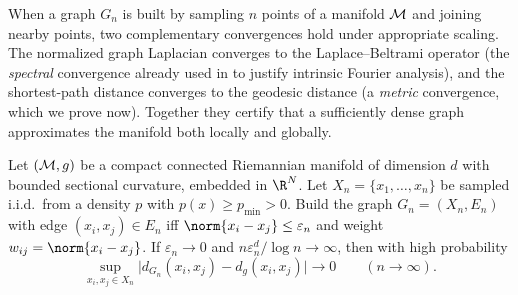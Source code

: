 When a graph $G_n$ is built by sampling $n$ points of a manifold $\mathcal{M}$ and
joining nearby points, two complementary convergences hold under appropriate
scaling. The normalized graph Laplacian converges to the Laplace--Beltrami
operator (the \emph{spectral} convergence already used in  to
justify intrinsic Fourier analysis), and the shortest-path distance converges to
the geodesic distance (a \emph{metric} convergence, which we prove now). Together
they certify that a sufficiently dense graph approximates the manifold both
locally and globally.

\begin{theorem}
\label{thm:geo:graph-convergence}
Let $(\mathcal{M}, g)$ be a compact connected Riemannian manifold of dimension $d$ with
bounded sectional curvature, embedded in $\R^N$. Let
$X_n = \{x_1, \dots, x_n\}$ be sampled i.i.d.\ from a density $p$ with
$p(x) \ge p_{\min} > 0$. Build the graph $G_n = (X_n, E_n)$ with edge
$(x_i,x_j) \in E_n$ iff $\norm{x_i - x_j} \le \varepsilon_n$ and weight
$w_{ij} = \norm{x_i - x_j}$. If $\varepsilon_n \to 0$ and
$n\varepsilon_n^d / \log n \to \infty$, then with high probability
\[
  \sup_{x_i, x_j \in X_n}
    \big| d_{G_n}(x_i, x_j) - d_g(x_i, x_j)\big| \to 0
  \qquad (n \to \infty).
\]
\end{theorem}

